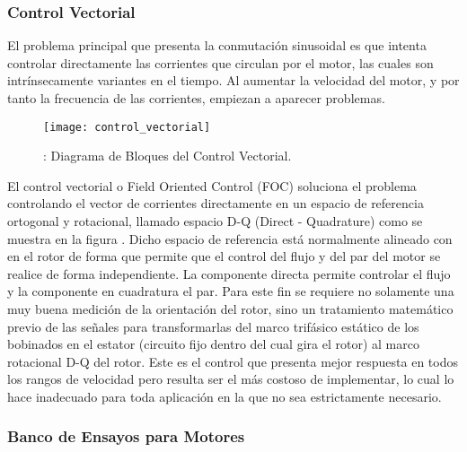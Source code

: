 \subsubsection{Control Vectorial}
\label{subsubsection: control_vectorial}

El problema principal que presenta la conmutación sinusoidal es que intenta controlar directamente las corrientes que circulan por el motor, las cuales son intrínsecamente variantes en el tiempo. Al aumentar la velocidad del motor, y por tanto la frecuencia de las corrientes, empiezan a aparecer problemas.

\begin{figure}[h]
  \centering
  \texttt{[image: control\_vectorial]}
  \caption{: Diagrama de Bloques del Control Vectorial.}\label{fig:control_vectorial}
\end{figure}

El control vectorial o Field Oriented Control (FOC) soluciona el problema controlando el vector de corrientes directamente en un espacio de referencia ortogonal y rotacional, llamado espacio D-Q (Direct - Quadrature) como se muestra en la figura . Dicho
espacio de referencia está normalmente alineado con en el rotor de forma que permite que el control del flujo y del par del motor se realice de forma independiente. La componente directa permite controlar el flujo y la componente en cuadratura el par. Para este fin se requiere no solamente una muy buena medición de la orientación del rotor, sino un tratamiento matemático previo de las señales para transformarlas del marco trifásico estático de los bobinados en el estator (circuito fijo dentro del cual gira el rotor) al marco rotacional D-Q del rotor. Este es el control que presenta mejor respuesta en todos los rangos de velocidad pero resulta ser el más costoso de implementar, lo cual lo hace inadecuado para toda aplicación en la que no sea estrictamente necesario.




\pagebreak

\subsubsection{Banco de Ensayos para Motores}
\label{subsubsection: banco_ensayos}


